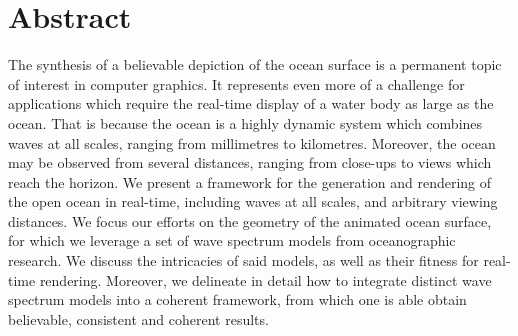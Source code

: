 \chapter*{Abstract}


The synthesis of a believable depiction of the ocean surface is a permanent
topic of interest in computer graphics. It represents even more of a
challenge for applications which require the real-time display of a water
body as large as the ocean.
That is because the ocean is a highly dynamic system which combines waves
at all scales, ranging from millimetres to kilometres. Moreover, the
ocean may be observed from several distances, ranging from close-ups
to views which reach the horizon. 
We present a framework for the generation and rendering of the
open ocean in real-time, including waves at all scales, and arbitrary
viewing distances. We focus our efforts on the geometry of the animated
ocean surface, for which we leverage a set of wave spectrum models from
oceanographic research. We discuss the intricacies of
said models, as well as their fitness for real-time rendering. Moreover,
we delineate in detail how to integrate distinct wave spectrum models into a
coherent framework, from which one is able obtain believable, consistent
and coherent results.

